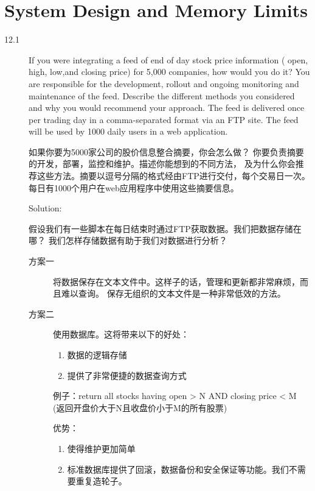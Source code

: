 \chapter{System Design and Memory Limits}

\begin{description}
\item[12.1] If you were integrating a feed of end of day stock price information ( open, high, low,and closing price) for 5,000 companies, how would you do it? You are responsible for the development, rollout and ongoing monitoring and maintenance of the feed. Describe the different methods you considered and why you would recommend your approach. The feed is delivered once per trading day in a comma-separated format via an FTP site. The feed will be used by 1000 daily users in a web application.

  如果你要为5000家公司的股价信息整合摘要，你会怎么做？ 你要负责摘要的开发，部署，监控和维护。描述你能想到的不同方法， 及为什么你会推荐这些方法。摘要以逗号分隔的格式经由FTP进行交付，每个交易日一次。 每日有1000个用户在web应用程序中使用这些摘要信息。

  Solution: 

  假设我们有一些脚本在每日结束时通过FTP获取数据。我们把数据存储在哪？ 我们怎样存储数据有助于我们对数据进行分析？

  \begin{description}
  \item[方案一]
    将数据保存在文本文件中。这样子的话，管理和更新都非常麻烦，而且难以查询。 保存无组织的文本文件是一种非常低效的方法。

  \item[方案二]
    使用数据库。这将带来以下的好处：
    \begin{enumerate}
    \item 数据的逻辑存储
    \item 提供了非常便捷的数据查询方式
    \end{enumerate}
    例子：return all stocks having open > N AND closing price < M (返回开盘价大于N且收盘价小于M的所有股票)

    优势：
    \begin{enumerate}
    \item 使得维护更加简单
    \item 标准数据库提供了回滚，数据备份和安全保证等功能。我们不需要重复造轮子。
    \end{enumerate}


\end{description}
\end{description}
